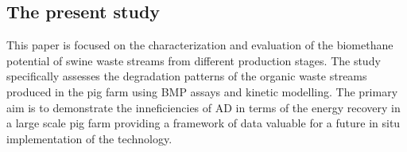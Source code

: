 \subsection{The present study}
This paper is focused on the characterization and evaluation of the biomethane potential of swine waste streams from different production stages. The study specifically assesses the degradation patterns of the organic waste streams produced in the pig farm using BMP assays and kinetic modelling. The primary aim is to demonstrate the inneficiencies of AD in terms of  the energy recovery in a large scale pig farm providing a framework of data valuable for a future in situ implementation of the technology.
